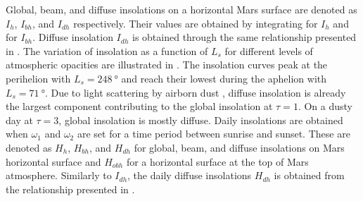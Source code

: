 Global, beam, and diffuse insolations on a horizontal Mars surface are denoted as $I_{h}$, $I_{bh}$, and $I_{dh}$ respectively. Their values are obtained by integrating  for $I_{h}$ and  for $I_{bh}$. Diffuse insolation $I_{dh}$ is obtained through the same relationship presented in . The variation of insolation as a function of $L_{s}$ for different levels of atmospheric opacities are illustrated in . The insolation curves peak at the perihelion with $L_{s} = \SI{248}{\degree}$ and reach their lowest during the aphelion with $L_{s} = \SI{71}{\degree}$. Due to light scattering by airborn dust , diffuse insolation is already the largest component contributing to the global insolation at $\tau = 1$. On a dusty day at $\tau = 3$, global insolation is mostly diffuse. Daily insolations are obtained when $\omega_1$ and $\omega_2$ are set for a time period between sunrise and sunset. These are denoted as $H_{h}$, $H_{bh}$, and $H_{dh}$ for global, beam, and diffuse insolations on Mars horizontal surface and $H_{obh}$ for a horizontal surface at the top of Mars atmosphere. Similarly to $I_{dh}$, the daily diffuse insolations $H_{dh}$ is obtained from the relationship presented in .

\vspace{0.5cm}


